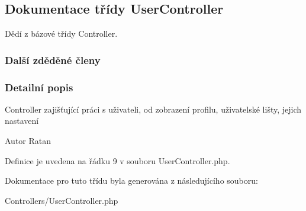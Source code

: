 \hypertarget{class_user_controller}{\subsection{Dokumentace třídy User\-Controller}
\label{class_user_controller}
}


Dědí z bázové třídy Controller.

\subsubsection*{Další zděděné členy}


\subsubsection{Detailní popis}
Controller zajišťující práci s uživateli, od zobrazení profilu, uživatelské lišty, jejich nastavení \begin{DoxyAuthor}{Autor}
Ratan 
\end{DoxyAuthor}


Definice je uvedena na řádku 9 v souboru User\-Controller.\-php.



Dokumentace pro tuto třídu byla generována z následujícího souboru\-:\begin{DoxyCompactItemize}
\item 
Controllers/User\-Controller.\-php\end{DoxyCompactItemize}
